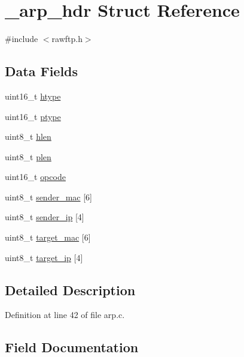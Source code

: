 \hypertarget{struct__arp__hdr}{}\section{\+\_\+arp\+\_\+hdr Struct Reference}
\label{struct__arp__hdr}


{\ttfamily \#include $<$rawftp.\+h$>$}

\subsection*{Data Fields}
\begin{DoxyCompactItemize}
\item 
uint16\+\_\+t \hyperlink{struct__arp__hdr_aaf87c38602b614bc7896cf7a5a90d372}{htype}
\item 
uint16\+\_\+t \hyperlink{struct__arp__hdr_ab4891e9b77eb26f33d21cfde982564cb}{ptype}
\item 
uint8\+\_\+t \hyperlink{struct__arp__hdr_aff25a69752648654e56c4ff3e0b1b226}{hlen}
\item 
uint8\+\_\+t \hyperlink{struct__arp__hdr_ae414f6c2299d9cf0eff8aa8e81f538d8}{plen}
\item 
uint16\+\_\+t \hyperlink{struct__arp__hdr_aeb39438c0aa5ad494c96060b00351545}{opcode}
\item 
uint8\+\_\+t \hyperlink{struct__arp__hdr_ae9f96a8fe1c86c1fcb056689a4063d0d}{sender\+\_\+mac} \mbox{[}6\mbox{]}
\item 
uint8\+\_\+t \hyperlink{struct__arp__hdr_a551d82aeea5aa701b04c92f771a78c80}{sender\+\_\+ip} \mbox{[}4\mbox{]}
\item 
uint8\+\_\+t \hyperlink{struct__arp__hdr_a493fbae2e8be850f95e56b528f25f0ce}{target\+\_\+mac} \mbox{[}6\mbox{]}
\item 
uint8\+\_\+t \hyperlink{struct__arp__hdr_ad62555f6b931e4d547077cbf904bc6e3}{target\+\_\+ip} \mbox{[}4\mbox{]}
\end{DoxyCompactItemize}


\subsection{Detailed Description}


Definition at line 42 of file arp.\+c.



\subsection{Field Documentation}
\hypertarget{struct__arp__hdr_aff25a69752648654e56c4ff3e0b1b226}{}\label{struct__arp__hdr_aff25a69752648654e56c4ff3e0b1b226} 
